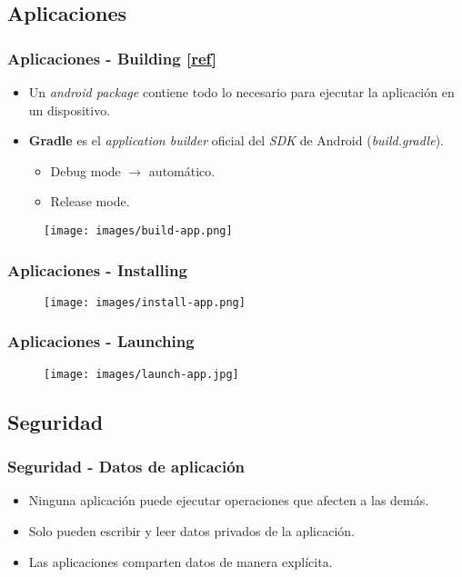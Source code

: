 \subsection{Aplicaciones}
\begin{frame}
  \frametitle{Aplicaciones - Building \href{https://developer.android.com/studio/build/}{[ref]}}
  \begin{itemize}
    \item Un \textit{android package} contiene todo lo necesario para ejecutar la aplicación en un dispositivo.
    
    \item \textbf{Gradle} es el \textit{application builder} oficial del \textit{SDK} de Android (\textit{build.gradle}).
    \begin{itemize}
  \item Debug mode $\rightarrow$ automático.
  \item Release mode.
    \end{itemize}
  \end{itemize}
  
  \begin{figure}
    \centering
    \texttt{[image: images/build-app.png]}
  \end{figure} 
\end{frame}

\begin{frame}
  \frametitle{Aplicaciones - Installing}
  \begin{figure}
    \centering
    \texttt{[image: images/install-app.png]}
  \end{figure} 
\end{frame}

\begin{frame}
  \frametitle{Aplicaciones - Launching}
    \begin{figure}
      \centering
      \texttt{[image: images/launch-app.jpg]}
    \end{figure}
\end{frame}

\subsection{Seguridad}
\begin{frame}
  \frametitle{Seguridad - Datos de aplicación}
  \begin{itemize}
    \item Ninguna aplicación puede ejecutar operaciones que afecten a las demás.
    
    \item Solo pueden escribir y leer datos privados de la aplicación.
    
    \item Las aplicaciones comparten datos de manera explícita.    
  \end{itemize}
\end{frame}

